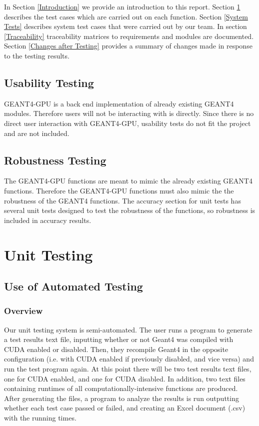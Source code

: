 \documentclass[12pt]{article}
\begin{document}
In Section \ref{Introduction} we provide an introduction to this report. Section \ref{Unit Testing} describes the test cases which are carried out on each function. Section \ref{System Tests} describes system test cases that were carried out by our team. In section \ref{Traceability} traceability matrices to requirements and modules are documented. Section \ref{Changes after Testing} provides a summary of changes made in response to the testing results.

\subsection{Usability Testing}
GEANT4-GPU is a back end implementation of already existing GEANT4 modules. Therefore users will not be interacting with is directly. Since there is no direct user interaction with GEANT4-GPU, usability tests do not fit the project and are not included.

\subsection{Robustness Testing}
The GEANT4-GPU functions are meant to mimic the already existing GEANT4 functions. Therefore the GEANT4-GPU functions must also mimic the the robustness of the GEANT4 functions. The accuracy section for unit tests has several unit tests designed to test the robustness of the functions, so robustness is included in accuracy results.

\section{Unit Testing} \label{Unit Testing}
\subsection{Use of Automated Testing}
\subsubsection{Overview}
Our unit testing system is semi-automated. The user runs a program to generate a test results text file, inputting whether or not Geant4 was compiled with CUDA enabled or disabled. Then, they recompile Geant4 in the opposite configuration (i.e. with CUDA enabled if previously disabled, and vice versa) and run the test program again. At this point there will be two test results text files, one for CUDA enabled, and one for CUDA disabled. In addition, two text files containing runtimes of all computationally-intensive functions are produced. After generating the files, a program to analyze the results is run outputting whether each test case passed or failed, and creating an Excel document (.csv) with the running times.
\end{document}
